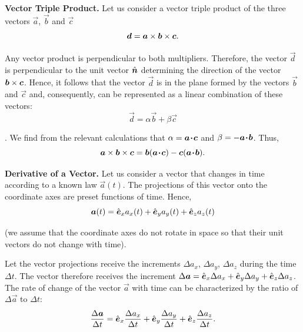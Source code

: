 \textbf{Vector Triple Product.} Let us consider a vector triple product of the three vectors $\vec{a}$, $\vec{b}$ and $\vec{c}$
\begin{equation*}
\boldsymbol{d} = \boldsymbol{a}\times\boldsymbol{b}\times\boldsymbol{c}.
\end{equation*}

\noindent
Any vector product is perpendicular to both multipliers. Therefore, the vector $\vec{d}$ is perpendicular to the unit vector $\hat{\boldsymbol{n}}$ determining the direction of the vector $\boldsymbol{b}\times\boldsymbol{c}$. Hence, it follows that the vector $\vec{d}$ is in the plane formed by the vectors $\vec{b}$ and $\vec{c}$ and, consequently, can be represented as a linear combination of these vectors:
\begin{equation*}
\vec{d} = \alpha\vec{b} + \beta\vec{c}
\end{equation*}

. We find from the relevant calculations that $\alpha=\boldsymbol{a\!\cdot\!c}$ and $\beta=-\boldsymbol{a\!\cdot\!b}$. Thus,
\begin{equation}\label{eq:1_35}
\boldsymbol{a}\times\boldsymbol{b}\times\boldsymbol{c} = \boldsymbol{b}(\boldsymbol{a\!\cdot\!c}) - \boldsymbol{c}(\boldsymbol{a\!\cdot\!b}).
\end{equation}

\textbf{Derivative of a Vector.} Let us consider a vector that changes in time according to a known law $\vec{a}(t)$. The projections of this vector onto the coordinate axes are preset functions of time. Hence,
\begin{equation}\label{eq:1_36}
\boldsymbol{a}(t) = \hat{\boldsymbol{e}}_{x}a_x(t) + \hat{\boldsymbol{e}}_{y}a_y(t) + \hat{\boldsymbol{e}}_{z}a_z(t)
\end{equation}

\noindent
(we assume that the coordinate axes do not rotate in space so that their unit vectors do not change with time).

Let the vector projections receive the increments $\Delta a_x$, $\Delta a_y$, $\Delta a_z$ during the time $\Delta t$. The vector therefore receives the increment $\Delta\boldsymbol{a} = \hat{\boldsymbol{e}}_{x}\Delta a_x + \hat{\boldsymbol{e}}_{y}\Delta a_y + \hat{\boldsymbol{e}}_{z}\Delta a_z$. The rate of change of the vector $\vec{a}$ with time can be characterized by the ratio of $\Delta\vec{a}$ to $\Delta t$:
\begin{equation}\label{eq:1_37}
\frac{\Delta\boldsymbol{a}}{\Delta t} = \hat{\boldsymbol{e}}_{x}\frac{\Delta a_x}{\Delta t} + \hat{\boldsymbol{e}}_{y}\frac{\Delta a_y}{\Delta t} + \hat{\boldsymbol{e}}_{z}\frac{\Delta a_z}{\Delta t}.
\end{equation}

